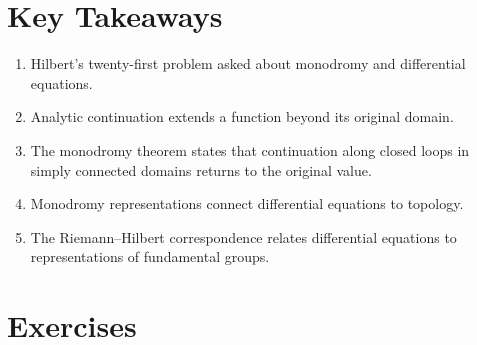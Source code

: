 \section*{Key Takeaways}

\begin{enumerate}
    \item Hilbert's twenty-first problem asked about monodromy and differential equations.
    \item Analytic continuation extends a function beyond its original domain.
    \item The monodromy theorem states that continuation along closed loops in simply connected domains returns to the original value.
    \item Monodromy representations connect differential equations to topology.
    \item The Riemann--Hilbert correspondence relates differential equations to representations of fundamental groups.
\end{enumerate}

\section*{Exercises}

